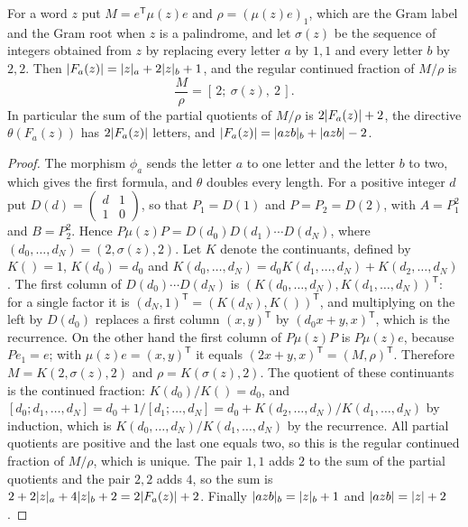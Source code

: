\begin{lemma}
\label{lem:length-cf}
For a word $z$ put $M=e^{\mathsf T}\mu(z)e$ and $\rho=(\mu(z)e)_1$, which are the Gram label and
the Gram root when $z$ is a palindrome, and let $\sigma(z)$ be the sequence of integers obtained
from $z$ by replacing every letter $a$ by $1,1$ and every letter $b$ by $2,2$. Then
$\lvert F_a(z)\rvert=\lvert z\rvert_a+2\lvert z\rvert_b+1$, and the regular continued fraction of $M/\rho$ is
$$
 \frac M\rho=[\,2;\ \sigma(z),\ 2\,].
$$
In particular the sum of the partial quotients of $M/\rho$ is $2\lvert F_a(z)\rvert+2$, the directive
$\theta(F_a(z))$ has $2\lvert F_a(z)\rvert$ letters, and $\lvert F_a(z)\rvert=\lvert azb\rvert_b+\lvert azb\rvert-2$.
\end{lemma}

\begin{proof}
The morphism $\phi_a$ sends the letter $a$ to one letter and the letter $b$ to two, which gives the
first formula, and $\theta$ doubles every length. For a positive integer $d$ put
$D(d)=\left(\begin{smallmatrix}d&1\\1&0\end{smallmatrix}\right)$, so that $P_1=D(1)$ and $P=P_2=D(2)$,
with $A=P_1^2$ and $B=P_2^2$. Hence $P\mu(z)P=D(d_0)D(d_1)\cdots D(d_N)$, where
$(d_0,\dots,d_N)=(2,\sigma(z),2)$. Let $K$ denote the continuants, defined by $K()=1$, $K(d_0)=d_0$
and $K(d_0,\dots,d_N)=d_0K(d_1,\dots,d_N)+K(d_2,\dots,d_N)$. The first column of
$D(d_0)\cdots D(d_N)$ is $(K(d_0,\dots,d_N),K(d_1,\dots,d_N))^{\mathsf T}$: for a single factor it is
$(d_N,1)^{\mathsf T}=(K(d_N),K())^{\mathsf T}$, and multiplying on the left by $D(d_0)$ replaces a first
column $(x,y)^{\mathsf T}$ by $(d_0x+y,x)^{\mathsf T}$, which is the recurrence. On the other hand the
first column of $P\mu(z)P$ is $P\mu(z)e$, because $Pe_1=e$; with $\mu(z)e=(x,y)^{\mathsf T}$ it equals
$(2x+y,x)^{\mathsf T}=(M,\rho)^{\mathsf T}$. Therefore $M=K(2,\sigma(z),2)$ and $\rho=K(\sigma(z),2)$.
The quotient of these continuants is the continued fraction: $K(d_0)/K()=d_0$, and
$[d_0;d_1,\dots,d_N]=d_0+1/[d_1;\dots,d_N]=d_0+K(d_2,\dots,d_N)/K(d_1,\dots,d_N)$ by induction, which
is $K(d_0,\dots,d_N)/K(d_1,\dots,d_N)$ by the recurrence. All partial quotients are positive and the
last one equals two, so this is the regular continued fraction of $M/\rho$, which is unique. The pair
$1,1$ adds $2$ to the sum of the partial quotients and the pair $2,2$ adds $4$, so the sum is
$2+2\lvert z\rvert_a+4\lvert z\rvert_b+2=2\lvert F_a(z)\rvert+2$. Finally $\lvert azb\rvert_b=\lvert z\rvert_b+1$ and $\lvert azb\rvert=\lvert z\rvert+2$.
\end{proof}

